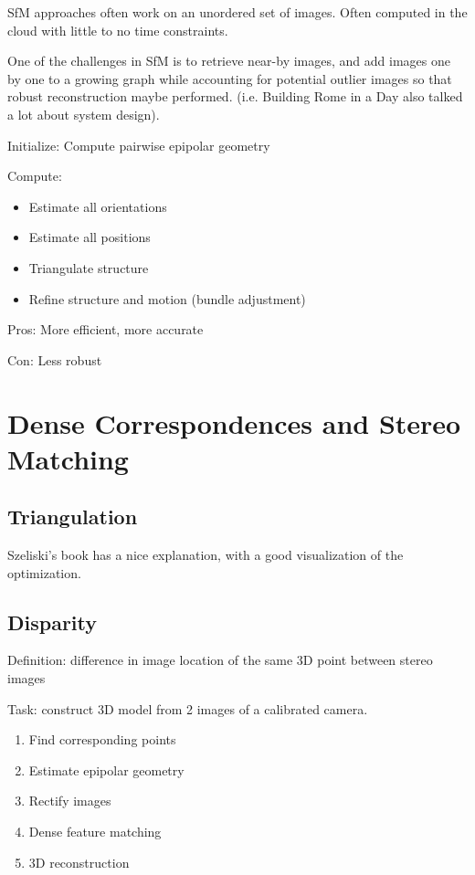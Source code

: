 SfM approaches often work on an unordered set of images. Often computed in the cloud with little to no time constraints.

One of the challenges in SfM is to retrieve near-by images, and add images one by one to a growing graph while accounting for potential outlier images so that robust reconstruction maybe performed. (i.e. Building Rome in a Day also talked a lot about system design).

Initialize: Compute pairwise epipolar geometry

Compute:
\begin{itemize}
\item Estimate all orientations
\item Estimate all positions
\item Triangulate structure
\item Refine structure and motion (bundle adjustment)
\end{itemize}

Pros: More efficient, more accurate 

Con: Less robust

\section{Dense Correspondences and Stereo Matching}

\subsection{Triangulation}
Szeliski's book has a nice explanation, with a good visualization of the optimization.

\subsection{Disparity}
Definition: difference in image location of the same 3D point between stereo images

Task: construct 3D model from 2 images of a calibrated camera.

\begin{enumerate}
\item Find corresponding points
\item Estimate epipolar geometry
\item Rectify images
\item Dense feature matching
\item 3D reconstruction
\end{enumerate}

